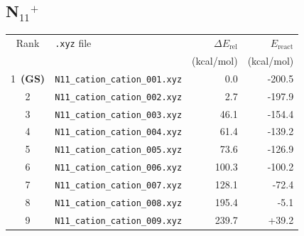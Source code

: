 \documentclass[11pt,a4paper]{article}
\begin{document}
\subsection*{N$_{11}$$^{+}$}
\begin{longtable}{clrr}
\toprule
Rank & \texttt{.xyz} file & $\Delta E_\text{rel}$ & $E_\text{react}$ \\
 & & (kcal/mol) & (kcal/mol) \\
\midrule\endhead
\rowcolor{gs}1~\textbf{(GS)} & \texttt{N11\_cation\_cation\_001.xyz} & 0.0 & -200.5 \\
2 & \texttt{N11\_cation\_cation\_002.xyz} & 2.7 & -197.9 \\
3 & \texttt{N11\_cation\_cation\_003.xyz} & 46.1 & -154.4 \\
4 & \texttt{N11\_cation\_cation\_004.xyz} & 61.4 & -139.2 \\
5 & \texttt{N11\_cation\_cation\_005.xyz} & 73.6 & -126.9 \\
6 & \texttt{N11\_cation\_cation\_006.xyz} & 100.3 & -100.2 \\
7 & \texttt{N11\_cation\_cation\_007.xyz} & 128.1 & -72.4 \\
8 & \texttt{N11\_cation\_cation\_008.xyz} & 195.4 & -5.1 \\
9 & \texttt{N11\_cation\_cation\_009.xyz} & 239.7 & +39.2 \\
\bottomrule
\end{longtable}
\end{document}
